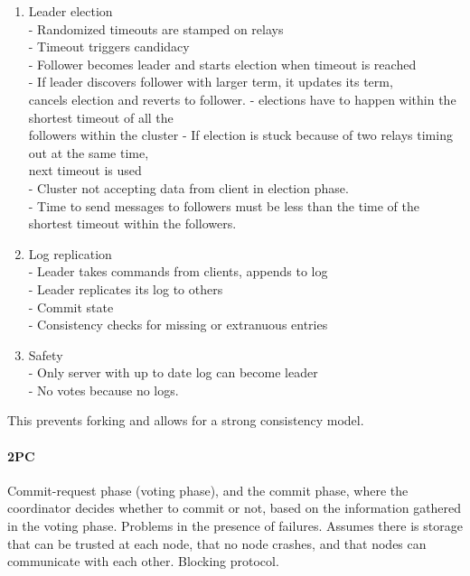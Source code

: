 \documentclass[]{article}
\begin{document}
%
\begin{enumerate}
	\item Leader election\\
	
	- Randomized timeouts are stamped on relays\\
	- Timeout triggers candidacy\\
	- Follower becomes leader and starts election when timeout is reached\\
	- If leader discovers follower with larger term, it updates its term,\\  cancels election and reverts to follower.
	- elections have to happen within the shortest timeout of all the\\ followers within the cluster
	- If election is stuck because of two relays timing out at the same time,\\ 
	next timeout is used\\
	- Cluster not accepting data from client in election phase.\\
	- Time to send messages to followers must be less than the time
	of the shortest timeout within the followers. 
	
	\item Log replication\\
		- Leader takes commands from clients, appends to log\\
		- Leader replicates its log to others\\
		- Commit state\\
		- Consistency checks for missing or extranuous entries\\
	\item Safety\\
	- Only server with up to date log can become leader\\
	- No votes because no logs.\\
\end{enumerate}
This prevents forking and allows for a strong consistency model.

\paragraph{2PC}
Commit-request phase (voting phase), and the commit phase, where the coordinator decides whether to commit or not, based on the information gathered in the voting phase. Problems in the presence of failures. Assumes there is storage that can be trusted at each node, that no node crashes, and that nodes can communicate with each other. Blocking protocol. 
\end{document}
